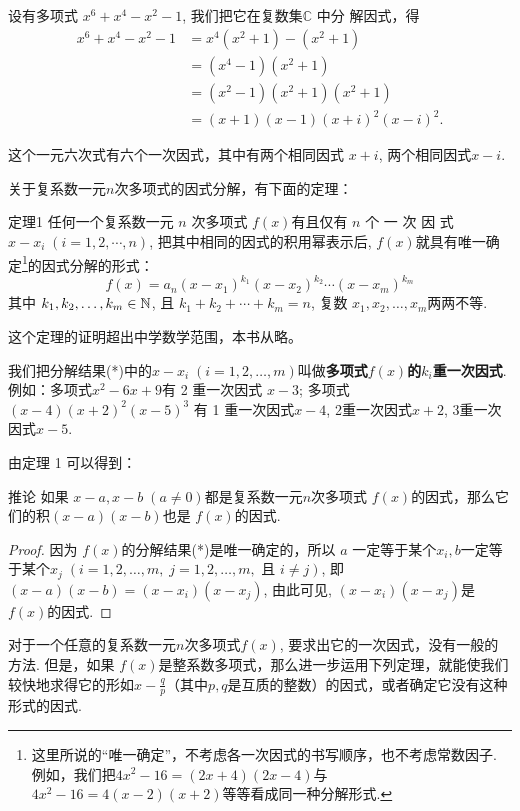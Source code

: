 设有多项式 $x^6+x^4-x^2-1$, 我们把它在复数集$\mathbb{C}$ 中分
解因式，得
\[\begin{split}
    x^{6}+x^{4}-x^{2}-1&=x^{4}(x^{2}+1)-(x^{2}+1)\\
    &=(x^{4}-1)(x^{2}+1)\\
    &=(x^{2}-1)(x^{2}+1)(x^{2}+1)\\
    &=(x+1)(x-1)(x+i)^{2}(x-i)^{2}.
\end{split}\]

这个一元六次式有六个一次因式，其中有两个相同因式
$x+i$, 两个相同因式$x-i$.

关于复系数一元$n$次多项式的因式分解，有下面的定理： 

\begin{thm}
{定理1} 任何一个复系数一元 $n$ 次多项式 $f(x)$有且仅有
$n$ 个 一 次 因 式 $x- x_i\; ( i= 1, 2, \cdots , n)$, 把其中相同的因式的积用幂表示后, $f(x)$就具有唯一确定\footnote{这里所说的“唯一确定”，不考虑各一次因式的书写顺序，也不考虑常数因子. 例如，我们把$4x^2-16=(2x+4)(2x-4)$与$4x^2-16=4(x-2)(x+2)$等等看成同一种分解形式.}的因式分解的形式：
\begin{equation}
    f( x) = a_{n}( x- x_{1}) ^{k_{1}}( x- x_{2}) ^{k_{2}}\cdots ( x- x_{m}) ^{k_{m}} \tag{*}
\end{equation}   
其中 $k_1,k_2,\ldots,k_m\in \mathbb{N}$, 且 $k_1+k_2+\cdots+k_m=n$, 复数 $x_1,x_2,\ldots,x_{m}$两两不等.
\end{thm}

这个定理的证明超出中学数学范围，本书从略。

我们把分解结果(*)中的$x-x_i\; (i=1,2,\ldots,m)$叫做\textbf{多项式$f(x)$的$k_i$重一次因式}. 例如：多项式$x^2-6x+9$有 2 重一次因式 $x-3$; 多项式$(x-4)(x+2)^2(x-5)^3$ 有 1 重一次因式$x- 4$, 2重一次因式$x+ 2$, 3重一次因式$x-5$.

由定理 1 可以得到：

\begin{thm}
{推论} 如果 $x-a,x-b\; (a\neq0)$都是复系数一元$n$次多项式 $f(x)$的因式，那么它们的积$(x-a)(x-b)$也是 $f(x)$的因式.    
\end{thm}

\begin{proof}
因为 $f(x)$的分解结果(*)是唯一确定的，所以 $a$ 一定等于某个$x_i,b$一定等于某个$x_j\; (i=1,2,\ldots,m,\; j=1,2,\ldots,m, \text{ 且 } i\neq j)$, 即$(x-a)(x-b)=(x-x_{i})(x-x_j)$, 由此可见, $(x-x_i)(x-x_j)$是 $f(x)$的因式.    
\end{proof}

对于一个任意的复系数一元$n$次多项式$f(x)$, 要求出它的一次因式，没有一般的方法. 但是，如果 $f(x)$是整系数多项式，那么进一步运用下列定理，就能使我们较快地求得它的形如$x-\frac qp$（其中$p,q$是互质的整数）的因式，或者确定它没有这种形式的因式.

